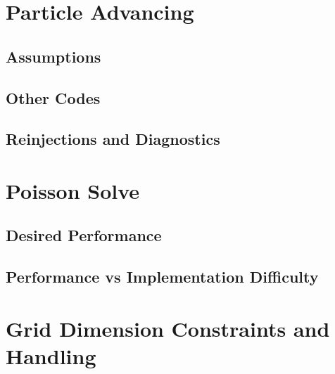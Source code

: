 	\section{Particle Advancing}
		\subsection{Assumptions}
		\subsection{Other Codes}
		\subsection{Reinjections and Diagnostics}

	\section{Poisson Solve}
		\subsection{Desired Performance}
		\subsection{Performance vs Implementation Difficulty}

	\section{Grid Dimension Constraints and Handling}
